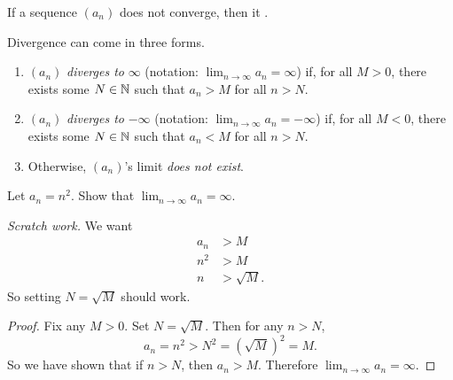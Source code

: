 \begin{definition}
  If a sequence $(a_n)$ does not converge, then it .

  Divergence can come in three forms.
  \begin{enumerate}
    \item $(a_n)$ \textit{diverges to} $\infty$ (notation: $\lim_{n
      \to \infty} a_n = \infty$) if, for all $M > 0$, there exists
      some $N \in \mathbb N$ such that $a_n > M$ for all $n > N$.
    \item $(a_n)$ \textit{diverges to} $-\infty$ (notation: $\lim_{n
      \to \infty} a_n = -\infty$) if, for all $M < 0$, there exists
      some $N \in \mathbb N$ such that $a_n < M$ for all $n > N$.
    \item Otherwise, $(a_n)$'s limit \textit{does not exist}.
  \end{enumerate}
\end{definition}

\begin{example}
  Let $a_n = n^2$. Show that $\lim_{n \to \infty} a_n = \infty$.

  \textit{Scratch work.} We want
  \begin{align*}
    a_n & > M \\
    n^2 & > M \\
    n & > \sqrt{M}.
  \end{align*}
  So setting $N = \sqrt{M}$ should work.

  \begin{proof}
    Fix any $M > 0$. Set $N = \sqrt{M}$. Then for any $n > N$,
    \[ a_n = n^2 > N^2 = (\sqrt{M})^2 = M. \]
    So we have shown that if $n > N$, then $a_n > M$. Therefore
    $\lim_{n \to \infty} a_n = \infty$.
  \end{proof}
\end{example}

